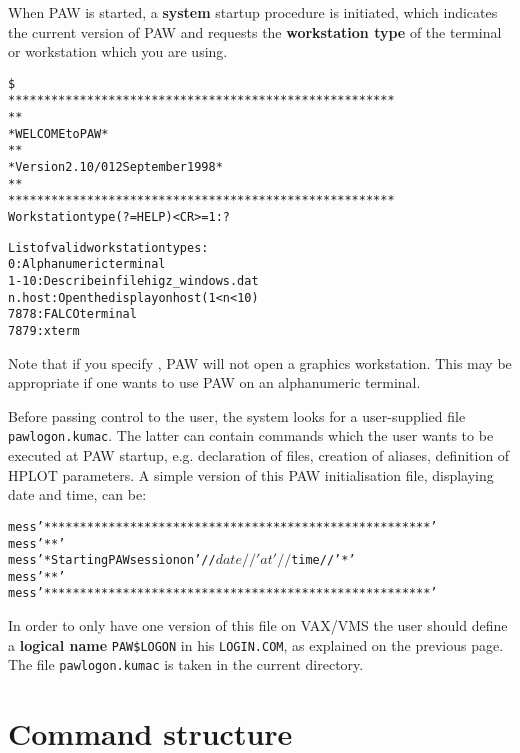 When PAW is started, a {\bf system} startup
procedure is initiated, which indicates the current
version of PAW and requests the {\bf workstation type} of
the terminal or workstation which you are using.
\begin{alltt}
\$ 
 ******************************************************
 *                                                    *
 *            W E L C O M E    to   P A W             *
 *                                                    *
 *        Version 2.10/01       2 September 1998      *
 *                                                    *
 ******************************************************
 Workstation type (?=HELP) <CR>=1 : ?

 List of valid workstation types:
       0:  Alphanumeric terminal
    1-10:  Describe in file higz_windows.dat
  n.host:  Open the display on host (1 < n < 10)
    7878:  FALCO terminal
    7879:  xterm
\end{alltt}
Note that if you specify {},
PAW will not open a graphics workstation.
This may be appropriate if one wants to use PAW on an alphanumeric
terminal.
 
Before passing control to the user, the system looks for a user-supplied file
\texttt{pawlogon.kumac}.
The latter can contain
commands which the user wants to be executed at PAW startup, e.g.
declaration of files, creation of aliases, definition of HPLOT parameters.
A simple version of this PAW initialisation file, displaying date
and time, can be:

\begin{alltt}
mess '******************************************************'
mess '*                                                    *'
mess '*   Starting PAW session on '//$date//' at '//$time//'     *'
mess '*                                                    *'
mess '******************************************************'
\end{alltt}
 
In order to
only have one version of this file on VAX/VMS the user should define
a {\bf logical name} \texttt{PAW\$LOGON} in his
\texttt{LOGIN.COM},
as explained on the previous page.
The file \texttt{pawlogon.kumac} is taken in the current directory.

\section{Command structure}
\label{sec:COMSTRU}
 
